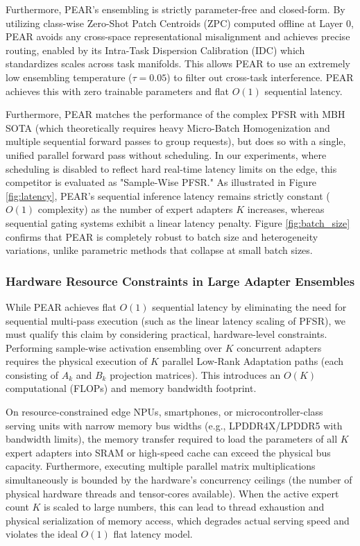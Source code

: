 Furthermore, PEAR's ensembling is strictly parameter-free and closed-form. By utilizing class-wise Zero-Shot Patch Centroids (ZPC) computed offline at Layer 0, PEAR avoids any cross-space representational misalignment and achieves precise routing, enabled by its Intra-Task Dispersion Calibration (IDC) which standardizes scales across task manifolds. This allows PEAR to use an extremely low ensembling temperature ($\tau = 0.05$) to filter out cross-task interference. PEAR achieves this with zero trainable parameters and flat $O(1)$ sequential latency.

Furthermore, PEAR matches the performance of the complex PFSR with MBH SOTA (which theoretically requires heavy Micro-Batch Homogenization and multiple sequential forward passes to group requests), but does so with a single, unified parallel forward pass without scheduling. In our experiments, where scheduling is disabled to reflect hard real-time latency limits on the edge, this competitor is evaluated as "Sample-Wise PFSR." As illustrated in Figure \ref{fig:latency}, PEAR's sequential inference latency remains strictly constant ($O(1)$ complexity) as the number of expert adapters $K$ increases, whereas sequential gating systems exhibit a linear latency penalty. Figure \ref{fig:batch_size} confirms that PEAR is completely robust to batch size and heterogeneity variations, unlike parametric methods that collapse at small batch sizes.

\subsubsection{Hardware Resource Constraints in Large Adapter Ensembles}
While PEAR achieves flat $O(1)$ sequential latency by eliminating the need for sequential multi-pass execution (such as the linear latency scaling of PFSR), we must qualify this claim by considering practical, hardware-level constraints. Performing sample-wise activation ensembling over $K$ concurrent adapters requires the physical execution of $K$ parallel Low-Rank Adaptation paths (each consisting of $A_k$ and $B_k$ projection matrices). This introduces an $O(K)$ computational (FLOPs) and memory bandwidth footprint.

On resource-constrained edge NPUs, smartphones, or microcontroller-class serving units with narrow memory bus widths (e.g., LPDDR4X/LPDDR5 with bandwidth limits), the memory transfer required to load the parameters of all $K$ expert adapters into SRAM or high-speed cache can exceed the physical bus capacity. Furthermore, executing multiple parallel matrix multiplications simultaneously is bounded by the hardware's concurrency ceilings (the number of physical hardware threads and tensor-cores available). When the active expert count $K$ is scaled to large numbers, this can lead to thread exhaustion and physical serialization of memory access, which degrades actual serving speed and violates the ideal $O(1)$ flat latency model. 

